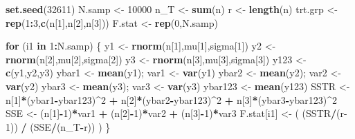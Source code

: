 \documentclass[
]{book}
\newenvironment{Shaded}{\begin{snugshade}}{\end{snugshade}}
\newcommand{\ControlFlowTok}[1]{\textcolor[rgb]{0.13,0.29,0.53}{\textbf{#1}}}
\newcommand{\DecValTok}[1]{\textcolor[rgb]{0.00,0.00,0.81}{#1}}
\newcommand{\FunctionTok}[1]{\textcolor[rgb]{0.13,0.29,0.53}{\textbf{#1}}}
\newcommand{\NormalTok}[1]{#1}
\newcommand{\OtherTok}[1]{\textcolor[rgb]{0.56,0.35,0.01}{#1}}
\newcommand{\SpecialCharTok}[1]{\textcolor[rgb]{0.81,0.36,0.00}{\textbf{#1}}}
\begin{document}
\begin{Shaded}
\begin{Highlighting}[]
\FunctionTok{set.seed}\NormalTok{(}\DecValTok{32611}\NormalTok{)}
\NormalTok{N.samp }\OtherTok{\textless{}{-}} \DecValTok{10000}
\NormalTok{n\_T }\OtherTok{\textless{}{-}} \FunctionTok{sum}\NormalTok{(n)}
\NormalTok{r }\OtherTok{\textless{}{-}} \FunctionTok{length}\NormalTok{(n)}
\NormalTok{trt.grp }\OtherTok{\textless{}{-}} \FunctionTok{rep}\NormalTok{(}\DecValTok{1}\SpecialCharTok{:}\DecValTok{3}\NormalTok{,}\FunctionTok{c}\NormalTok{(n[}\DecValTok{1}\NormalTok{],n[}\DecValTok{2}\NormalTok{],n[}\DecValTok{3}\NormalTok{]))}
\NormalTok{F.stat }\OtherTok{\textless{}{-}} \FunctionTok{rep}\NormalTok{(}\DecValTok{0}\NormalTok{,N.samp)}

\ControlFlowTok{for}\NormalTok{ (i1 }\ControlFlowTok{in} \DecValTok{1}\SpecialCharTok{:}\NormalTok{N.samp) \{  }
\NormalTok{  y1 }\OtherTok{\textless{}{-}} \FunctionTok{rnorm}\NormalTok{(n[}\DecValTok{1}\NormalTok{],mu[}\DecValTok{1}\NormalTok{],sigma[}\DecValTok{1}\NormalTok{])}
\NormalTok{  y2 }\OtherTok{\textless{}{-}} \FunctionTok{rnorm}\NormalTok{(n[}\DecValTok{2}\NormalTok{],mu[}\DecValTok{2}\NormalTok{],sigma[}\DecValTok{2}\NormalTok{])}
\NormalTok{  y3 }\OtherTok{\textless{}{-}} \FunctionTok{rnorm}\NormalTok{(n[}\DecValTok{3}\NormalTok{],mu[}\DecValTok{3}\NormalTok{],sigma[}\DecValTok{3}\NormalTok{])}
\NormalTok{  y123 }\OtherTok{\textless{}{-}} \FunctionTok{c}\NormalTok{(y1,y2,y3)}
\NormalTok{  ybar1 }\OtherTok{\textless{}{-}} \FunctionTok{mean}\NormalTok{(y1); var1 }\OtherTok{\textless{}{-}} \FunctionTok{var}\NormalTok{(y1)}
\NormalTok{  ybar2 }\OtherTok{\textless{}{-}} \FunctionTok{mean}\NormalTok{(y2); var2 }\OtherTok{\textless{}{-}} \FunctionTok{var}\NormalTok{(y2)}
\NormalTok{  ybar3 }\OtherTok{\textless{}{-}} \FunctionTok{mean}\NormalTok{(y3); var3 }\OtherTok{\textless{}{-}} \FunctionTok{var}\NormalTok{(y3)}
\NormalTok{  ybar123 }\OtherTok{\textless{}{-}} \FunctionTok{mean}\NormalTok{(y123)}
\NormalTok{  SSTR }\OtherTok{\textless{}{-}}\NormalTok{ n[}\DecValTok{1}\NormalTok{]}\SpecialCharTok{*}\NormalTok{(ybar1}\SpecialCharTok{{-}}\NormalTok{ybar123)}\SpecialCharTok{\^{}}\DecValTok{2} \SpecialCharTok{+}\NormalTok{ n[}\DecValTok{2}\NormalTok{]}\SpecialCharTok{*}\NormalTok{(ybar2}\SpecialCharTok{{-}}\NormalTok{ybar123)}\SpecialCharTok{\^{}}\DecValTok{2} \SpecialCharTok{+} 
\NormalTok{          n[}\DecValTok{3}\NormalTok{]}\SpecialCharTok{*}\NormalTok{(ybar3}\SpecialCharTok{{-}}\NormalTok{ybar123)}\SpecialCharTok{\^{}}\DecValTok{2}
\NormalTok{  SSE }\OtherTok{\textless{}{-}}\NormalTok{ (n[}\DecValTok{1}\NormalTok{]}\SpecialCharTok{{-}}\DecValTok{1}\NormalTok{)}\SpecialCharTok{*}\NormalTok{var1 }\SpecialCharTok{+}\NormalTok{ (n[}\DecValTok{2}\NormalTok{]}\SpecialCharTok{{-}}\DecValTok{1}\NormalTok{)}\SpecialCharTok{*}\NormalTok{var2 }\SpecialCharTok{+}\NormalTok{ (n[}\DecValTok{3}\NormalTok{]}\SpecialCharTok{{-}}\DecValTok{1}\NormalTok{)}\SpecialCharTok{*}\NormalTok{var3}
\NormalTok{  F.stat[i1] }\OtherTok{\textless{}{-}}\NormalTok{ ( (SSTR}\SpecialCharTok{/}\NormalTok{(r}\DecValTok{{-}1}\NormalTok{)) }\SpecialCharTok{/}\NormalTok{ (SSE}\SpecialCharTok{/}\NormalTok{(n\_T}\SpecialCharTok{{-}}\NormalTok{r)) )}
\NormalTok{\}}


\end{Highlighting}
\end{Shaded}
\end{document}
